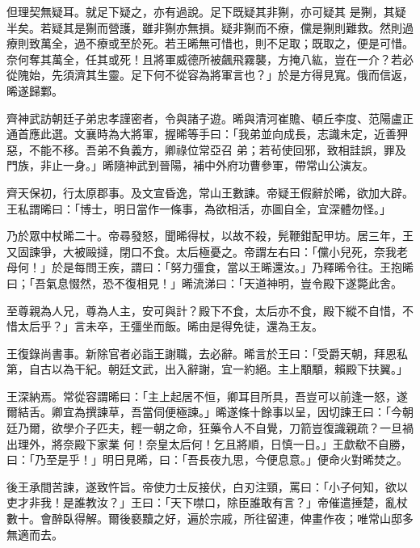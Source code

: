 \begin{pinyinscope}
 但理契無疑耳。就足下疑之，亦有過說。足下既疑其非猘，亦可疑其
 是猘，其疑半矣。若疑其是猘而營護，雖非猘亦無損。疑非猘而不療，儻是猘則難救。然則過療則致萬全，過不療或至於死。若王晞無可惜也，則不足取；既取之，便是可惜。奈何奪其萬全，任其或死！且將軍威德所被飆飛霧襲，方掩八紘，豈在一介？若必從隗始，先須濟其生靈。足下何不從容為將軍言也？」於是方得見寬。俄而信返，晞遂歸鄴。



 齊神武訪朝廷子弟忠孝謹密者，令與諸子遊。晞與清河崔贍、頓丘李度、范陽盧正通首應此選。文襄時為大將軍，握晞等手曰：「我弟並向成長，志識未定，近善狎惡，不能不移。吾弟不負義方，卿祿位常亞召
 弟；若茍使回邪，致相詿誤，罪及門族，非止一身。」晞隨神武到晉陽，補中外府功曹參軍，帶常山公演友。



 齊天保初，行太原郡事。及文宣昏逸，常山王數諫。帝疑王假辭於晞，欲加大辟。王私謂晞曰：「博士，明日當作一條事，為欲相活，亦圖自全，宜深體勿怪。」



 乃於眾中杖晞二十。帝尋發怒，聞晞得杖，以故不殺，髡鞭鉗配甲坊。居三年，王又固諫爭，大被毆撻，閉口不食。太后極憂之。帝謂左右曰：「儻小兒死，奈我老母何！」於是每問王疾，謂曰：「努力彊食，當以王晞還汝。」乃釋晞令往。王抱晞曰；「吾氣息惙然，恐不復相見！」晞流涕曰：「天道神明，豈令殿下遂斃此舍。



 至尊親為人兄，尊為人主，安可與計？殿下不食，太后亦不食，殿下縱不自惜，不惜太后乎？」言未卒，王彊坐而飯。晞由是得免徒，還為王友。



 王復錄尚書事。新除官者必詣王謝職，去必辭。晞言於王曰：「受爵天朝，拜恩私第，自古以為干紀。朝廷文武，出入辭謝，宜一約絕。主上顒顒，賴殿下扶翼。」



 王深納焉。常從容謂晞曰：「主上起居不恒，卿耳目所具，吾豈可以前逢一怒，遂爾結舌。卿宜為撰諫草，吾當伺便極諫。」晞遂條十餘事以呈，因切諫王曰：「今朝廷乃爾，欲學介子匹夫，輕一朝之命，狂藥令人不自覺，刀箭豈復識親疏？一旦禍出理外，將奈殿下家業
 何！奈皇太后何！乞且將順，日慎一日。」王歔欷不自勝，曰：「乃至是乎！」明日見晞，曰：「吾長夜九思，今便息意。」便命火對晞焚之。



 後王承間苦諫，遂致忤旨。帝使力士反接伏，白刃注頸，罵曰：「小子何知，欲以吏才非我！是誰教汝？」王曰：「天下噤口，除臣誰敢有言？」帝催遣捶楚，亂杖數十。會醉臥得解。爾後褻黷之好，遍於宗戚，所往留連，俾畫作夜；唯常山邸多無適而去。




\end{pinyinscope}
